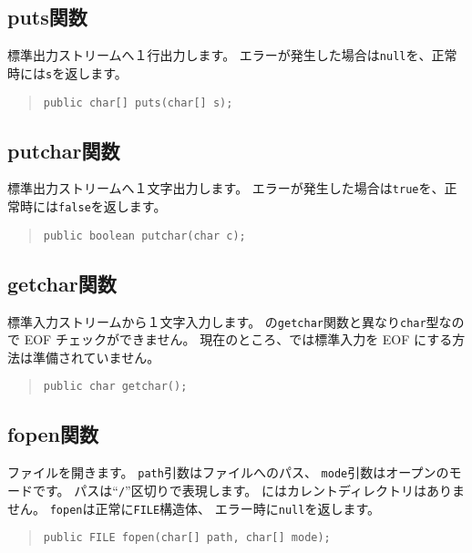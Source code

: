 \subsection{puts関数}

標準出力ストリームへ１行出力します。
エラーが発生した場合は\verb/null/を、正常時には\verb/s/を返します。

\begin{quote}
\begin{verbatim}
public char[] puts(char[] s);
\end{verbatim}
\end{quote}

\subsection{putchar関数}

標準出力ストリームへ１文字出力します。
エラーが発生した場合は\verb/true/を、正常時には\verb/false/を返します。

\begin{quote}
\begin{verbatim}
public boolean putchar(char c);
\end{verbatim}
\end{quote}

\subsection{getchar関数}

標準入力ストリームから１文字入力します。
\cl の\verb/getchar/関数と異なり\verb/char/型なので EOF チェックができません。
現在のところ、\tacos では標準入力を EOF にする方法は準備されていません。

\begin{quote}
\begin{verbatim}
public char getchar();
\end{verbatim}
\end{quote}

\subsection{fopen関数}

ファイルを開きます。
\verb/path/引数はファイルへのパス、
\verb/mode/引数はオープンのモードです。
パスは``\verb;/;''区切りで表現します。
\tacos にはカレントディレクトリはありません。
\verb/fopen/は正常に\verb/FILE/構造体、
エラー時に\verb/null/を返します。

\begin{quote}
\begin{verbatim}
public FILE fopen(char[] path, char[] mode);
\end{verbatim}
\end{quote}

